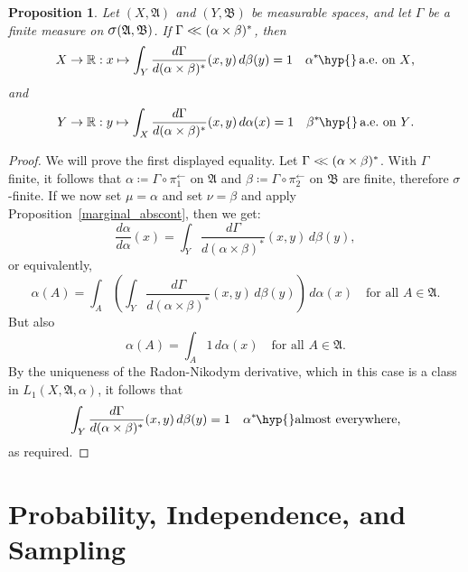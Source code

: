 \documentclass[
twoside=true,
paper=letter,
fontsize=11pt,
pagesize=auto,
leqno,
openany,
headsepline,
overfullrule,
]{scrbook}
\theoremstyle{plain}
\theoremstyle{plain}
\newtheorem{prop}[thm]{Proposition}
\theoremstyle{definition}
\theoremstyle{bfnoteitalic}
\theoremstyle{bfnoteroman}
\newcommand{\sigalg}[1]{\mathfrak{#1}}
\newcommand{\definedby}{\coloneqq}
\newcommand{\sagb}{\mathop{\hbox{\large{$\sigma$}}}\nolimits}
\newcommand{\textsigma}{\hbox{\large{$\sigma$}}\kern-1pt}
\newcommand{\preimage}[1]{#1^{\leftarrow}}
\newcommand{\R}{\mathbb{R}}
\newcommand{\sigmaalgebra}{\sigalg{A}}
\newcommand{\sigmaalgebraii}{\sigalg{B}}
\newcommand{\productsig}[2]{\sagb(#1,#2)}
\newcommand{\kernast}{\ast\kern-1pt}
\newcommand{\measurespace}{X}
\newcommand{\measurespaceii}{Y}
\newcommand{\mspaceelt}{x}
\newcommand{\mspaceeltii}{y}
\newcommand{\abscont}{\mathrel{< \kern-3.5pt <}}
\newcommand{\measmu}{\mu}
\newcommand{\measnu}{\nu}
\newcommand{\seti}{A}
\newcommand{\projectionone}{\pi_1}
\newcommand{\projectiontwo}{\pi_2}
\newcommand{\measonprod}{\Gamma}%
\newcommand{\marginalone}{\alpha}%
\newcommand{\marginaltwo}{\beta}%
\begin{document}
\begin{prop}\label{almost_a_measure}
Let
$(\measurespace, \sigmaalgebra)$
and
$(\measurespaceii, \sigmaalgebraii)$
be measurable spaces, and let  $\measonprod$ be a finite measure on
$\productsig{\sigmaalgebra}{\sigmaalgebraii}$.
If $\measonprod \abscont (\marginalone\times\marginaltwo)^*$, then
\[
\measurespace\to\R
:\mspaceelt\mapsto
\int_\measurespaceii \dfrac{d\measonprod}{d(\marginalone\times\marginaltwo)^*}
(\mspaceelt,\mspaceeltii)
\,d\marginaltwo(\mspaceeltii)
=
1
\quad
\text{$\marginalone^\kernast$\hyp{}\,a.e.\ on $\measurespace$,}
\]
and
\[
\measurespaceii\to\R:\mspaceeltii\mapsto
\int_\measurespace \dfrac{d\measonprod}{d(\marginalone\times\marginaltwo)^*}
(\mspaceelt,\mspaceeltii)
\,d\marginalone(\mspaceelt)
=
1
\quad
\text{$\marginaltwo^\kernast$\hyp{}\,a.e.\ on $\measurespaceii$.}
\]
\end{prop}
\begin{proof}
We will prove the first displayed equality.
Let $\measonprod\abscont(\marginalone\times\marginaltwo)^*$.
With $\measonprod$ finite, it follows that
$\marginalone\definedby
\measonprod \circ \preimage{\projectionone}$
on $\sigmaalgebra$
and
$\marginaltwo\definedby
\measonprod \circ \preimage{\projectiontwo}$
on $\sigmaalgebraii$
are finite, therefore \textsigma\hyp{}finite.
If we now set
$\measmu = \marginalone$
and set
$\measnu=\marginaltwo$ and apply Proposition~\ref{marginal_abscont}, then we get:
\[
\frac{d \marginalone}{d\marginalone}(\mspaceelt)
=
\int_{\measurespaceii}
\frac{d\measonprod}{d(\marginalone\times\marginaltwo)^*}
(\mspaceelt,\mspaceeltii)
\,d\marginaltwo(\mspaceeltii),
\]
or equivalently,
\[
\marginalone(\seti)
=
\int_\seti
\left(
\int_{\measurespaceii}
\frac{d\measonprod}{d(\marginalone\times\marginaltwo)^*}
(\mspaceelt,\mspaceeltii)
\,d\marginaltwo(\mspaceeltii)
\right)
\,d\marginalone(\mspaceelt)\quad\text{for all $\seti\in\sigmaalgebra$.}
\]
But also
\[
\marginalone(\seti)
=
\int_\seti
1
\,d\marginalone(\mspaceelt)\quad\text{for all $\seti\in\sigmaalgebra$.}
\]
By the uniqueness of the Radon-Nikodym derivative, which in this case is a class in
$L_1(\measurespace, \sigmaalgebra,\marginalone)$, it follows that
\[
\int_{\measurespaceii}
\frac{d\measonprod}{d(\marginalone\times\marginaltwo)^*}
(\mspaceelt,\mspaceeltii)
\,d\marginaltwo(\mspaceeltii)
= 1
\quad
\text{$\marginalone^\kernast$\hyp{}almost everywhere,}
\]
as required.
\end{proof}


\chapter{Probability, Independence, and Sampling}
\end{document}

